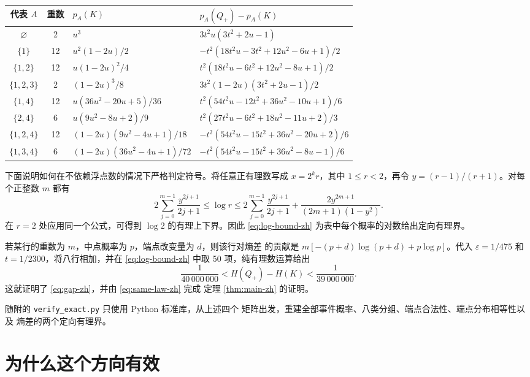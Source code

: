 \documentclass[UTF8,11pt,a4paper]{ctexart}
\begin{document}
\begin{center}
\setlength{\tabcolsep}{3.5pt}
\renewcommand{\arraystretch}{1.25}
\scriptsize
\begin{tabular}{@{}ccll@{}}
\toprule
代表 $A$&重数&$p_A(K)$&$p_A(Q_+)-p_A(K)$\\
\midrule
\(\varnothing\)&2
 &\(u^3\)
 &\(3t^2u(3t^2+2u-1)\)\\
\(\{1\}\)&12
 &\(u^2(1-2u)/2\)
 &\(-t^2(18t^2u-3t^2+12u^2-6u+1)/2\)\\
\(\{1,2\}\)&12
 &\(u(1-2u)^2/4\)
 &\(t^2(18t^2u-6t^2+12u^2-8u+1)/2\)\\
\(\{1,2,3\}\)&2
 &\((1-2u)^3/8\)
 &\(3t^2(1-2u)(3t^2+2u-1)/2\)\\
\(\{1,4\}\)&12
 &\(u(36u^2-20u+5)/36\)
 &\(t^2(54t^2u-12t^2+36u^2-10u+1)/6\)\\
\(\{2,4\}\)&6
 &\(u(9u^2-8u+2)/9\)
 &\(t^2(27t^2u-6t^2+18u^2-11u+2)/3\)\\
\(\{1,2,4\}\)&12
 &\((1-2u)(9u^2-4u+1)/18\)
 &\(-t^2(54t^2u-15t^2+36u^2-20u+2)/6\)\\
\(\{1,3,4\}\)&6
 &\((1-2u)(36u^2-4u+1)/72\)
 &\(-t^2(54t^2u-15t^2+36u^2-8u-1)/6\)\\
\bottomrule
\end{tabular}
\end{center}

下面说明如何在不依赖浮点数的情况下严格判定符号。将任意正有理数写成
$x=2^kr$，其中 $1\le r<2$，再令 $y=(r-1)/(r+1)$。对每个正整数
$m$ 都有
\begin{equation}\label{eq:log-bound-zh}
 2\sum_{j=0}^{m-1}\frac{y^{2j+1}}{2j+1}
 \le \log r\le
 2\sum_{j=0}^{m-1}\frac{y^{2j+1}}{2j+1}
 +\frac{2y^{2m+1}}{(2m+1)(1-y^2)}.
\end{equation}
在 $r=2$ 处应用同一个公式，可得到 $\log2$ 的有理上下界。因此
\eqref{eq:log-bound-zh} 为表中每个概率的对数给出定向有理界。

若某行的重数为 $m$，中点概率为 $p$，端点改变量为 $d$，则该行对熵差
的贡献是 $m[-(p+d)\log(p+d)+p\log p]$。代入
$\varepsilon=1/475$ 和 $t=1/2300$，将八行相加，并在
\eqref{eq:log-bound-zh} 中取 50 项，纯有理数运算给出
\[
 \frac1{40\,000\,000}
 <H(Q_+)-H(K)
 <\frac1{39\,000\,000}.
\]
这就证明了 \eqref{eq:gap-zh}，并由 \eqref{eq:same-law-zh} 完成
定理 \ref{thm:main-zh} 的证明。

随附的 \texttt{verify\_exact.py} 只使用 Python 标准库，从上述四个
矩阵出发，重建全部事件概率、八类分组、端点合法性、端点分布相等性以及
熵差的两个定向有理界。

\section{为什么这个方向有效}
\end{document}

